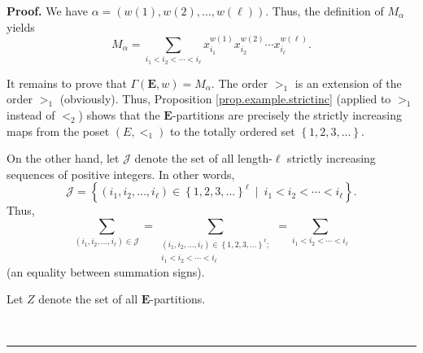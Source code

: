 \documentclass[numbers=enddot,12pt,final,onecolumn,notitlepage,abstracton]{scrartcl}
\theoremstyle{definition}
\newenvironment{proof}[1][Proof]{\noindent\textbf{#1.} }{\ \rule{0.5em}{0.5em}}
\let\sumnonlimits\sum
\renewcommand{\sum}{\sumnonlimits\limits}
\newenvironment{verlong}{}{}
\begin{document}
\begin{verlong}
\begin{footnotesize}
\begin{proof}
We have $\alpha=\left(  w\left(  1\right)  ,w\left(  2\right)  ,\ldots
,w\left(  \ell\right)  \right)  $. Thus, the definition of $M_{\alpha}$ yields%
\begin{equation}
M_{\alpha}=\sum_{i_{1}<i_{2}<\cdots<i_{\ell}}x_{i_{1}}^{w\left(  1\right)
}x_{i_{2}}^{w\left(  2\right)  }\cdots x_{i_{\ell}}^{w\left(  \ell\right)  }.
\label{pf.prop.example.Gamma.b.b.Malpha=}%
\end{equation}


It remains to prove that $\Gamma\left(  \mathbf{E},w\right)  =M_{\alpha}$. The
order $>_{1}$ is an extension of the order $>_{1}$ (obviously). Thus,
Proposition \ref{prop.example.strictinc} (applied to $>_{1}$ instead of
$<_{2}$) shows that the $\mathbf{E}$-partitions are precisely the strictly
increasing maps from the poset $\left(  E,<_{1}\right)  $ to the totally
ordered set $\left\{  1,2,3,\ldots\right\}  $.

On the other hand, let $\mathcal{J}$ denote the set of all length-$\ell$
strictly increasing sequences of positive integers. In other words,%
\[
\mathcal{J}=\left\{  \left(  i_{1},i_{2},\ldots,i_{\ell}\right)  \in\left\{
1,2,3,\ldots\right\}  ^{\ell}\ \mid\ i_{1}<i_{2}<\cdots<i_{\ell}\right\}  .
\]
Thus,%
\[
\sum_{\left(  i_{1},i_{2},\ldots,i_{\ell}\right)  \in\mathcal{J}}%
=\sum_{\substack{\left(  i_{1},i_{2},\ldots,i_{\ell}\right)  \in\left\{
1,2,3,\ldots\right\}  ^{\ell};\\i_{1}<i_{2}<\cdots<i_{\ell}}}=\sum
_{i_{1}<i_{2}<\cdots<i_{\ell}}%
\]
(an equality between summation signs).

Let $Z$ denote the set of all $\mathbf{E}$-partitions.


\end{proof}
\end{footnotesize}
\end{verlong}
\end{document}
